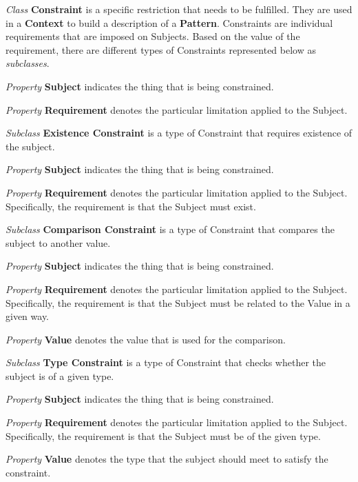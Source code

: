 \begin{description}
\item\textit{Class} \textbf{Constraint} is a specific restriction that needs to be fulfilled. They
are used in a \textbf{Context} to build a description of a \textbf{Pattern}. Constraints are
individual requirements that are imposed on Subjects. Based on the value of the requirement, there
are different types of Constraints represented below as \textit{subclasses}.

\textit{Property} \textbf{Subject} indicates the thing that is being constrained.

\textit{Property} \textbf{Requirement} denotes the particular limitation applied to the Subject.


\item\textit{Subclass} \textbf{Existence Constraint} is a type of Constraint that requires existence of the subject. 

\textit{Property} \textbf{Subject} indicates the thing that is being constrained.

\textit{Property} \textbf{Requirement} denotes the particular limitation applied to the Subject. Specifically, the requirement is that the Subject must exist.


\item\textit{Subclass} \textbf{Comparison Constraint} is a type of Constraint that compares the subject to another value.

\textit{Property} \textbf{Subject} indicates the thing that is being constrained.

\textit{Property} \textbf{Requirement} denotes the particular limitation applied to the Subject. Specifically, the requirement is that the Subject must be related to the Value in a given way.

\textit{Property} \textbf{Value} denotes the value that is used for the comparison.


\item\textit{Subclass} \textbf{Type Constraint} is a type of Constraint that checks whether the subject is of a given type.

\textit{Property} \textbf{Subject} indicates the thing that is being constrained.

\textit{Property} \textbf{Requirement} denotes the particular limitation applied to the Subject. Specifically, the requirement is that the Subject must be of the given type.

\textit{Property} \textbf{Value} denotes the type that the subject should meet to satisfy the constraint.



\end{description}
